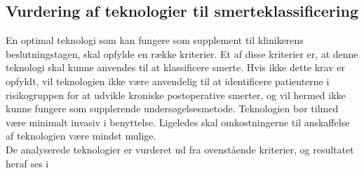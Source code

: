 \subsection{Vurdering af teknologier til smerteklassificering}
En optimal teknologi som kan fungere som supplement til klinikerens beslutningstagen, skal opfylde en række kriterier. Et af disse kriterier er, at denne teknologi skal kunne anvendes til at klassificere smerte. Hvis ikke dette krav er opfyldt, vil teknologien ikke være anvendelig til at identificere patienterne i risikogruppen for at udvikle kroniske postoperative smerter, og vil hermed ikke kunne fungere som supplerende undersøgelsesmetode. Teknologien bør tilmed være minimalt invasiv i benyttelse. Ligeledes skal omkostningerne til anskaffelse af teknologien være mindst mulige.\\
De analyserede teknologier er vurderet ud fra ovenstående kriterier, og resultatet heraf ses i   


